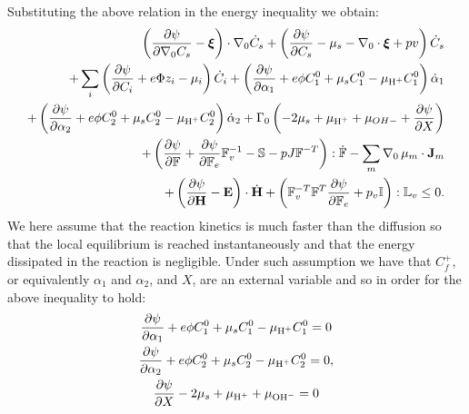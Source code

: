\documentclass[12pt]{extarticle}
\newcommand{\F}{\ensuremath{\mathbb{F}}}
\begin{document}
Substituting the above relation in the energy inequality we obtain:
\begin{equation*}
\begin{aligned}
\left(\frac{\partial \psi}{\partial \nabla_0 C_s}-\boldsymbol{\xi}\right) \cdot \nabla_0 \dot{C}_s + \left(\frac{\partial \psi}{\partial C_s}-\mu_s-\nabla_0 \cdot \boldsymbol{\xi}+p v\right)\dot{C}_s\\
+ \sum_i\left(\frac{\partial \psi}{\partial C_i} + e\Phi z_i-\mu_i\right) \dot{C}_i + \left(\frac{\partial \psi}{\partial \alpha_1}+e\phi C^0_1+\mu_s C^0_1-\mu_{\ce{H+}}C^0_1\right)\dot{\alpha}_1 \\
+ \left(\frac{\partial \psi}{\partial \alpha_2}+e\phi C^0_2+\mu_s C^0_2-\mu_{\ce{H+}}C^0_2\right)\dot{\alpha}_2 + \Gamma_0 \left(-2\mu_s+\mu_{\ce{H+}}+\mu_{OH-}+\frac{\partial \psi}{\partial X}\right)\\
+ \left(\frac{\partial \psi}{\partial \F} + \frac{\partial \psi}{\partial\F_e}\F_v^{-1}- \mathbb{S} - p J \F^{-T}\right): \dot{\F}- \sum_m \nabla_0 \,\mu_m \cdot \mathbf{J}_m \\
+\left(\frac{\partial \psi}{\partial \mathbf{H}}-\mathbf{E}\right) \cdot \dot{\mathbf{H}}+ \left(\F_v^{-T}\F^T\frac{\partial \psi}{\partial \F_e}+p_v\mathbb{I}\right):\mathbb{L}_v\leq 0 . 
\end{aligned}
\end{equation*} 
We here assume that the reaction kinetics is much faster than the diffusion so that the local equilibrium is reached instantaneously and that the energy dissipated in the reaction is negligible. Under such assumption we have that $C_f^+$, or equivalently $\alpha_1$ and $\alpha_2$, and $X$, are an external variable and so in order for the above inequality to hold:
\begin{gather}
\frac{\partial \psi}{\partial \alpha_1}+e\phi C^0_1+\mu_s C^0_1-\mu_{\ce{H+}}C^0_1=0 \label{eqp1}\\
\frac{\partial \psi}{\partial \alpha_2}+e\phi C^0_2+\mu_s C^0_2-\mu_{\ce{H+}}C^0_2=0,\\
\frac{\partial \psi}{\partial X}-2 \mu_s +\mu_{\ce{H+}} + \mu_{\ce{OH-}}=0 \label{eqp3}
\end{gather}
 
\end{document}
